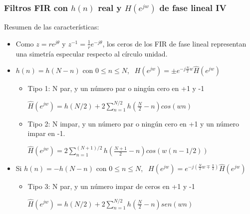 
\begin{frame}
\frametitle{Filtros FIR con $h(n)$ real y $H(e^{jw})$ de fase lineal IV}

\footnotesize

Resumen de las características:

\begin{itemize}

\item Como $z=re^{j\theta}$ y $z^{-1}=\frac{1}{r}e^{-j\theta}$, los ceros de los FIR de fase lineal representan una simetría especular respecto al círculo unidad.

\item $h(n)=h(N-n)$ con $0\le n \le N$,  $\:\:H(e^{jw})=\pm e^{-j\frac{N}{2}w}\hat H(e^{jw})$


\begin{itemize}
\footnotesize
\item Tipo 1: N par, y un número par o ningún cero en +1 y -1

\vspace{0.1cm}

\hspace{1.05cm}$\hat H(e^{jw})=h(N/2)+2\sum_{n=1}^{N/2}h(\frac{N}{2}-n)cos(wn)$



\vspace{0.1cm}

\item Tipo 2: N impar, y un número par o ningún cero en +1 y un número impar en -1.

\vspace{0.1cm}
\hspace{1.05cm}$\hat H(e^{jw})=2\sum_{n=1}^{(N+1)/2}h(\frac{N+1}{2}-n)cos(w(n-1/2))$

\vspace{0.1cm}

\end{itemize}

\item Si $h(n)=-h(N-n)$ con $0\le n \le N$,  $\:\:H(e^{jw})= e^{-j(\frac{N}{2}w \mp \frac{\pi}{2})}\hat H(e^{jw})$

\begin{itemize}
\footnotesize
\item Tipo 3: N par, y un número impar de ceros en +1 y -1

\vspace{0.1cm}
\hspace{1.05cm}$\hat H(e^{jw})=h(N/2)+2\sum_{n=1}^{N/2}h(\frac{N}{2}-n)sen(wn)$


\end{itemize}
\end{itemize}
\end{frame}
